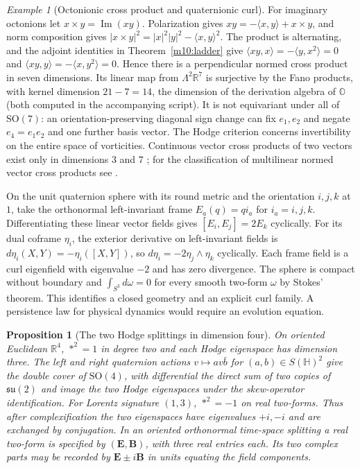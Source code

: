 \documentclass[11pt,reqno]{amsart}
\newtheorem{proposition}[theorem]{Proposition}
\theoremstyle{definition}
\theoremstyle{remark}
\newtheorem{example}[theorem]{Example}
\numberwithin{equation}{section}
\newcommand{\R}{\mathbb{R}}
\newcommand{\HH}{\mathbb{H}}
\newcommand{\im}{\operatorname{Im}}
\newcommand{\ip}[2]{\langle #1,#2\rangle}
\newcommand{\SO}{\mathrm{SO}}
\begin{document}
\begin{example}[Octonionic cross product and quaternionic curl]
\label{m10:cross-curl}
For imaginary octonions let \(x\times y=\im(xy)\). Polarization
gives \(xy=-\ip{x}{y}+x\times y\), and norm composition gives
\(|x\times y|^2=|x|^2|y|^2-\ip{x}{y}^2\). The product is alternating,
and the adjoint identities in Theorem~\ref{m10:ladder} give
\(\ip{xy}{x}=-\ip{y}{x^2}=0\) and
\(\ip{xy}{y}=-\ip{x}{y^2}=0\).
Hence there is a perpendicular normed cross product in seven
dimensions. Its linear map from \(\Lambda^2\R^7\) is surjective
by the Fano products, with kernel dimension \(21-7=14\), the dimension
of the derivation algebra of \(\mathbb O\) (both computed in the
accompanying script).
It is not equivariant under all of \(\SO(7)\): an orientation-preserving
diagonal sign change can fix \(e_1,e_2\) and negate \(e_4=e_1e_2\)
and one further basis vector. The Hodge criterion concerns
invertibility on the entire space of vorticities. Continuous vector
cross products of two vectors exist only in dimensions \(3\) and \(7\)
\cite{m10:Eckmann}; for the classification of multilinear normed vector
cross products see \cite[\S2]{m10:BrownGray}.

On the unit quaternion sphere with its round metric and the
orientation \(i,j,k\) at \(1\), take the orthonormal left-invariant
frame \(E_a(q)=q i_a\) for \(i_a=i,j,k\). Differentiating these
linear vector fields gives \([E_i,E_j]=2E_k\) cyclically.
For its dual coframe \(\eta_i\), the exterior derivative on
left-invariant fields is \(d\eta_i(X,Y)=-\eta_i([X,Y])\), so
\(d\eta_i=-2\eta_j\wedge\eta_k\) cyclically. Each frame field
is a curl eigenfield with eigenvalue \(-2\) and has zero divergence.
The sphere is compact without boundary and
\(\int_{S^3}d\omega=0\) for every smooth two-form \(\omega\)
by Stokes' theorem. This identifies a closed geometry and an
explicit curl family. A persistence law for physical dynamics
would require an evolution equation.
\end{example}

\begin{proposition}[The two Hodge splittings in dimension four]
\label{m10:four}
On oriented Euclidean \(\R^4\), \(*^2=1\) in degree two
and each Hodge eigenspace has dimension three. The left and right
quaternion actions \(v\mapsto a v\bar b\) for \((a,b)\in S(\HH)^2\)
give the double cover of \(\SO(4)\), with differential the
direct sum of two copies of \(\mathfrak{su}(2)\) and image the two
Hodge eigenspaces under the skew-operator identification.
For Lorentz signature \((1,3)\), \(*^2=-1\) on real
two-forms. Thus after complexification the two eigenspaces have
eigenvalues \(+i,-i\) and are exchanged by conjugation. In an
oriented orthonormal time-space splitting a real two-form is
specified by \((\mathbf E,\mathbf B)\), with three real entries
each. Its two complex parts may be recorded by
\(\mathbf E\pm i\mathbf B\) in units equating the field components.
\end{proposition}
\end{document}
